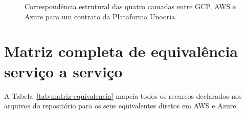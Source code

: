 \begin{figure}[H]
{}
\caption[Topologia comparada GCP, AWS e Azure]{Correspondência estrutural das
  quatro camadas entre GCP, AWS e Azure para um contrato da Plataforma Unooria.}
\label{fig:topologia-comparada}
\end{figure}

\section{Matriz completa de equivalência serviço a serviço}

A Tabela~\ref{tab:matriz-equivalencia} mapeia todos os recursos declarados nos
arquivos  do repositório  para os seus
equivalentes diretos em AWS e Azure.


